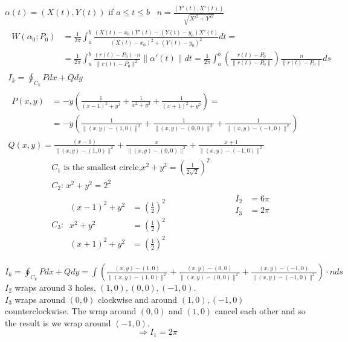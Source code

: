 \documentclass[twoside]{amsart}
\theoremstyle{plain}
\theoremstyle{definition}
\newcommand{\exercisehead}[1]
  {
   \noindent{\small\bf Exercise #1.}
   \smallskip}
\begin{document}
\exercisehead{6} $\alpha(t) = (X(t),Y(t))$ if $a \leq t \leq b$  \quad \quad \, $ n = \frac{ (Y'(t),X'(t))}{ \sqrt{ X'^2 + Y'^2}}$
\[
\begin{gathered}
\begin{aligned}
  W(\alpha_0; P_0) & = \frac{1}{2\pi} \int_a^b \frac{ (X(t) - x_0) Y'(t) - (Y(t) - y_0)X'(t) }{ (X(t) - x_0)^2 + (Y(t) - y_0)^2 } dt = \\ 
  & = \frac{1}{2\pi} \int_a^b \frac{ (r(t) - P_0) \cdot n}{ \| r(t) - P_0 \|^2 } \| \alpha'(t) \| dt = \frac{1}{2\pi} \int_a^b \left( \frac{ r(t) - P_0 }{ \| r(t) - P_0 \| } \right) \frac{ n }{ \| r(t) - P_0 \| } ds 
\end{aligned} \\
  I_k = \oint_{C_k} P dx + Q dy \\ 
  \begin{aligned}
  P(x,y) & = -y \left( \frac{1}{ (x-1)^2 + y^2 } + \frac{1}{ x^2 + y^2} + \frac{1}{ (x+1)^2 + y^2 } \right) = \\ 
  &  = - y \left( \frac{1}{ \| (x,y) - (1,0) \|^2 } + \frac{1}{ \| (x,y) - (0,0) \|^2 } + \frac{1}{ \| (x,y) - (-1,0) \|^2 } \right) 
\end{aligned} \\
  Q(x,y) = \frac{ (x-1) }{ \| (x,y) - (1,0) \|^2 } + \frac{ x}{ \| (x,y) - (0,0) \|^2 } + \frac{ x+1}{ \| (x,y) - (-1,0) \|^2 }
\end{gathered}
\]
\[
\begin{aligned}
  & C_1 \text{ is the smallest circle,} x^2 + y^2 = \left( \frac{1}{ 2\sqrt{2}} \right)^2 \\
  & C_2: \, x^2 + y^2 = 2^2 \\
  & \quad \, \\
  & C_3: \, \begin{aligned} (x-1)^2  + y^2 & = \left( \frac{1}{2} \right)^2 \\ x^2 + y^2 & = \left( \frac{1}{2} \right)^2 \\ (x+1)^2 + y^2 & = \left( \frac{1}{2} \right)^2 \end{aligned}
\end{aligned} \quad \quad \, 
\begin{aligned}
  I_2 & = 6 \pi \\ 
  I_3 & = 2 \pi 
\end{aligned}
\]

$I_k = \oint_{C_k} P dx + Q dy = \int \left( \frac{ (x,y) - (1,0)}{ \| (x,y) - (1,0) \|^2 } + \frac{ (x,y) - (0,0) }{ \| (x,y) - (0,0) \|^2 } + \frac{ (x,y) - (-1,0)}{ \| (x,y) - (-1,0) \|^2 } \right) \cdot n ds $ \\
$I_2$ wraps around 3 holes, $(1,0), (0,0), (-1,0)$.   \\
$I_3$ wraps around $(0,0)$ clockwise and around $(1,0), (-1,0)$ counterclockwise.  The wrap around $(0,0)$ and $(1,0)$ cancel each other and so the result is we wrap around $(-1,0)$.  
\[
\Longrightarrow \boxed{ I_1 = 2\pi }
\]
\end{document}
